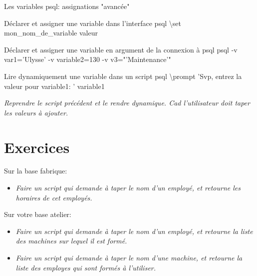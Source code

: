\documentclass[dvipsnames]{beamer}
\begin{document}
\begin{frame}{Les variables psql: assignations "avancée"}
	\begin{block}{Déclarer et assigner une variable dans l'interface psql}
		\textbackslash set mon\_nom\_de\_variable valeur
	\end{block}

	\begin{block}{Déclarer et assigner une variable en argument de la connexion à psql}
		psql -v var1='Ulysse' -v variable2=130 -v v3="'Maintenance'"
	\end{block}
	
	\begin{block}{Lire dynamiquement une variable dans un script psql}
		\textbackslash prompt 'Svp, entrez la valeur pour variable1: ' variable1
	\end{block}

	\textit{Reprendre le script précédent et le rendre dynamique. Cad l'utilisateur doit taper les valeurs à ajouter.}	
	
\end{frame}


\section{Exercices}
\begin{frame}{}

Sur la base fabrique:
\begin{itemize}
 	\item \textit{Faire un script qui demande à taper le nom d'un employé, et retourne les horaires de cet employés.}	
\end{itemize}
		
Sur votre base atelier:
\begin{itemize}
	\item \textit{Faire un script qui demande à taper le nom d'un employé, et retourne la liste des machines sur lequel il est formé.}
	\item \textit{Faire un script qui demande à taper le nom d'une machine, et retourne la liste des employes qui sont formés à l'utiliser.}
\end{itemize}
\end{frame}

%
%
\end{document}
